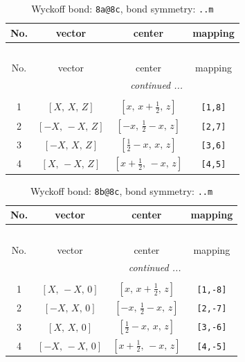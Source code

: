 \documentclass[fleqn,8pt]{jsarticle}
\begin{document}
\begin{longtable}{cccc}
\caption{Wyckoff bond: {\tt 8a@8c}, bond symmetry: {\tt ..m}}
 \\
 \hline \hline
No. & vector & center & mapping \\ \hline \endfirsthead

\multicolumn{3}{l}{\tablename\ \thetable{}} \\
 \hline \hline
No. & vector & center & mapping \\ \hline \endhead

 \hline \hline
\multicolumn{3}{r}{\footnotesize\it continued ...} \\ \endfoot

 \hline \hline
\multicolumn{3}{r}{} \\ \endlastfoot

1 & $\left[ X,\, X,\, Z \right]$ & $\left[ x,\, x + \frac{1}{2},\, z \right]$ & {\tt [1,8]} \\ \hline
2 & $\left[ - X,\, - X,\, Z \right]$ & $\left[ - x,\, \frac{1}{2} - x,\, z \right]$ & {\tt [2,7]} \\ \hline
3 & $\left[ - X,\, X,\, Z \right]$ & $\left[ \frac{1}{2} - x,\, x,\, z \right]$ & {\tt [3,6]} \\ \hline
4 & $\left[ X,\, - X,\, Z \right]$ & $\left[ x + \frac{1}{2},\, - x,\, z \right]$ & {\tt [4,5]} \\
\end{longtable}
\renewcommand{\arraystretch}{1.2}
\begin{longtable}{cccc}
\caption{Wyckoff bond: {\tt 8b@8c}, bond symmetry: {\tt ..m}}
 \\
 \hline \hline
No. & vector & center & mapping \\ \hline \endfirsthead

\multicolumn{3}{l}{\tablename\ \thetable{}} \\
 \hline \hline
No. & vector & center & mapping \\ \hline \endhead

 \hline \hline
\multicolumn{3}{r}{\footnotesize\it continued ...} \\ \endfoot

 \hline \hline
\multicolumn{3}{r}{} \\ \endlastfoot

1 & $\left[ X,\, - X,\, 0 \right]$ & $\left[ x,\, x + \frac{1}{2},\, z \right]$ & {\tt [1,-8]} \\ \hline
2 & $\left[ - X,\, X,\, 0 \right]$ & $\left[ - x,\, \frac{1}{2} - x,\, z \right]$ & {\tt [2,-7]} \\ \hline
3 & $\left[ X,\, X,\, 0 \right]$ & $\left[ \frac{1}{2} - x,\, x,\, z \right]$ & {\tt [3,-6]} \\ \hline
4 & $\left[ - X,\, - X,\, 0 \right]$ & $\left[ x + \frac{1}{2},\, - x,\, z \right]$ & {\tt [4,-5]} \\
\end{longtable}
\end{document}
